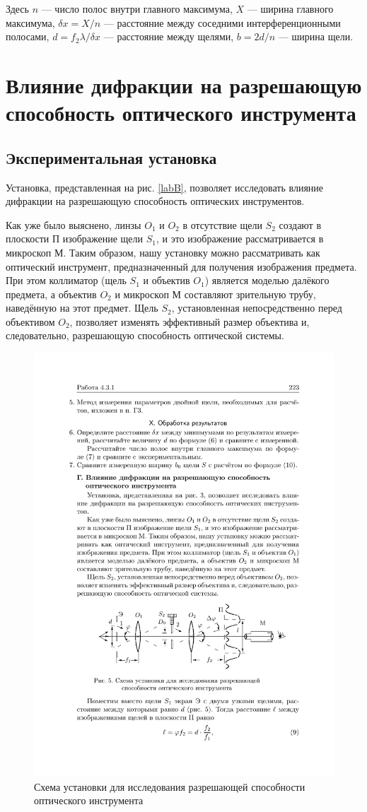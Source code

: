 \documentclass[a4paper,12pt]{article} %
\begin{document}
Здесь $n$ --- число полос внутри главного максимума, $X$ --- ширина главного максимума, $\delta x = X/n$ --- расстояние между соседними интерференционными полосами, $d = f_2 \lambda/\delta x$ --- расстояние между щелями, $b = 2d/n$ --- ширина щели.

\section{Влияние дифракции на разрешающую способность оптического инструмента}

\subsection{Экспериментальная установка}

Установка, представленная на рис. \ref{labB}, позволяет исследовать влияние дифракции на разрешающую способность оптических инструментов.

Как уже было выяснено, линзы $O_1$ и $ O_2$ в отсутствие щели $S_2$ создают в плоскости П изображение щели $S_1$, и это изображение рассматривается в микроскоп М. Таким образом, нашу установку можно рассматривать как оптический инструмент, предназначенный для получения изображения предмета. При этом коллиматор (щель $S_1$ и объектив $O_1$) является моделью далёкого предмета, а объектив $O_2$ и микроскоп М составляют зрительную трубу, наведённую на этот предмет.
Щель $S_2$, установленная непосредственно перед объективом $O_2$, позволяет изменять эффективный размер объектива и, следовательно, разрешающую способность оптической системы.

\begin{figure}[h!]
	\centering
	\includegraphics[width=0.8\linewidth]{d.pdf}
	\caption{Схема установки для исследования разрешающей
		способности оптического инструмента}
	\label{labG}
\end{figure}
\end{document}
